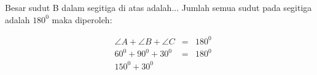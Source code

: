 \documentclass[12pt, border=5mm]{article}
\begin{document}

Besar sudut B dalam segitiga di atas adalah...\newline
Jumlah semua sudut pada segitiga adalah $180^{0}$ maka diperoleh:

$$
\begin{aligned}
&\angle{A}+\angle{B}+\angle{C} & = & 180^{0} \\
&60^{0}+90^{0}+30^{0} & = & 180^{0} \\
&150^{0}+30^{0}
\end{aligned}
$$
\end{document}
